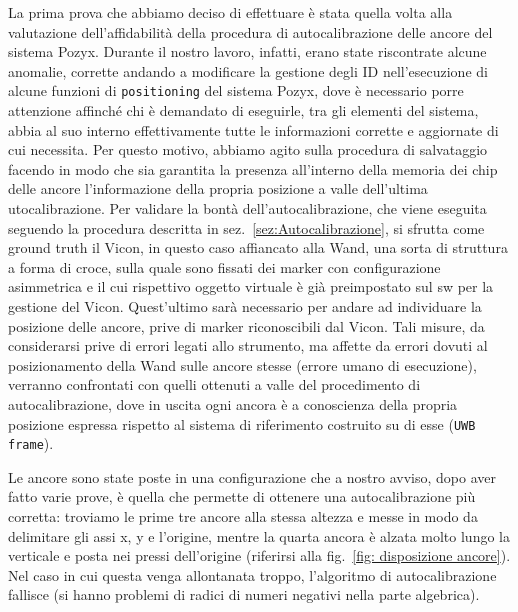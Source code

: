La prima prova che abbiamo deciso di effettuare è stata quella volta alla valutazione dell'affidabilità della procedura di autocalibrazione delle ancore del
sistema Pozyx. Durante il nostro lavoro, infatti, erano state riscontrate alcune anomalie, corrette andando a modificare la gestione degli ID nell'esecuzione 
di alcune funzioni di \verb|positioning| del sistema Pozyx, dove è necessario porre attenzione affinché chi è demandato di eseguirle, tra gli elementi del sistema, 
abbia al suo interno effettivamente tutte le informazioni corrette e aggiornate di cui necessita. Per questo motivo, abbiamo agito sulla procedura di salvataggio 
facendo in modo che sia garantita la presenza all'interno della memoria dei chip delle ancore l'informazione della propria posizione a valle dell'ultima 
utocalibrazione. 
Per validare la bontà dell'autocalibrazione, che viene eseguita seguendo la procedura descritta in sez.~\ref{sez:Autocalibrazione}, si sfrutta come ground truth il 
Vicon, in questo caso affiancato alla Wand, una sorta di struttura a forma di croce, sulla quale sono fissati dei marker con configurazione asimmetrica e il cui 
rispettivo oggetto virtuale è già preimpostato sul sw per la gestione del Vicon. 
Quest'ultimo sarà necessario per andare ad individuare la posizione delle ancore, prive di marker riconoscibili dal Vicon. Tali misure, da considerarsi prive di 
errori legati allo strumento, ma affette da errori dovuti al posizionamento della Wand sulle ancore stesse (errore umano di esecuzione), verranno confrontati con 
quelli ottenuti a valle del procedimento di autocalibrazione, dove in uscita ogni ancora è a conoscienza della propria posizione espressa rispetto al sistema di 
riferimento costruito su di esse (\verb|UWB frame|).

Le ancore sono state poste in una configurazione che a nostro avviso, dopo aver fatto varie prove, è quella che permette di ottenere una autocalibrazione più corretta: 
troviamo le prime tre ancore alla stessa altezza e messe in modo da delimitare gli assi x, y e l'origine, mentre la quarta ancora è alzata molto lungo la verticale 
e posta nei pressi dell'origine (riferirsi alla fig.~\ref{fig: disposizione ancore}). Nel caso in cui questa venga allontanata troppo, l'algoritmo di autocalibrazione 
fallisce (si hanno problemi di radici di numeri negativi nella parte algebrica).

